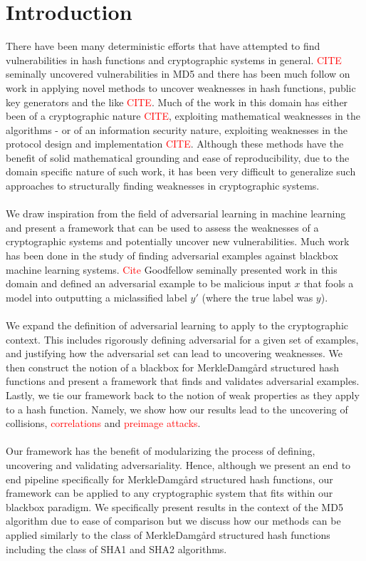 \documentclass[letterpaper,twocolumn,10pt]{article}
\begin{document}
\section{Introduction}
There have been many deterministic efforts that have attempted to find vulnerabilities in hash functions and cryptographic systems in general. \textcolor{red}{CITE} seminally uncovered vulnerabilities in MD5 and there has been much follow on work in applying novel methods to uncover weaknesses in hash functions, public key generators and the like \textcolor{red}{CITE}. Much of the work in this domain has either been of a cryptographic nature \textcolor{red}{CITE}, exploiting mathematical weaknesses in the algorithms - or of an information security nature, exploiting weaknesses in the protocol design and implementation \textcolor{red}{CITE}. Although these methods have the benefit of solid mathematical grounding and ease of reproducibility, due to the domain specific nature of such work, it has been very difficult to generalize such approaches to structurally finding weaknesses in cryptographic systems. 
\\
\\
We draw inspiration from the field of adversarial learning in machine learning and present a framework that can be used to assess the weaknesses of a cryptographic systems and potentially uncover new vulnerabilities. Much work has been done in the study of finding adversarial examples against blackbox machine learning systems. \textcolor{red}{Cite} Goodfellow seminally presented work in this domain and defined an adversarial example to be malicious input $x$ that fools a model into outputting a miclassified label $y'$ (where the true label was $y$). 
\\
\\
We expand the definition of adversarial learning to apply to the cryptographic context. This includes rigorously defining adversarial for a given set of examples, and justifying how the adversarial set can lead to uncovering weaknesses. We then construct the notion of a blackbox for Merkle{\textendash}Damg\r{a}rd structured hash functions and present a framework that finds and validates adversarial examples. Lastly, we tie our framework back to the notion of weak properties as they apply to a hash function. Namely, we show how our results lead to the uncovering of collisions, \textcolor{red}{correlations} and \textcolor{red}{preimage attacks}. 
\\
\\
Our framework has the benefit of modularizing the process of defining, uncovering and validating adversariality. Hence, although we present an end to end pipeline specifically for Merkle{\textendash}Damg\r{a}rd structured hash functions, our framework can be applied to any cryptographic system that fits within our blackbox paradigm. We specifically present results in the context of the MD5 algorithm due to ease of comparison but we discuss how our methods can be applied similarly to the class of Merkle{\textendash}Damg\r{a}rd structured hash functions including the class of SHA1 and SHA2 algorithms. 
\end{document}
